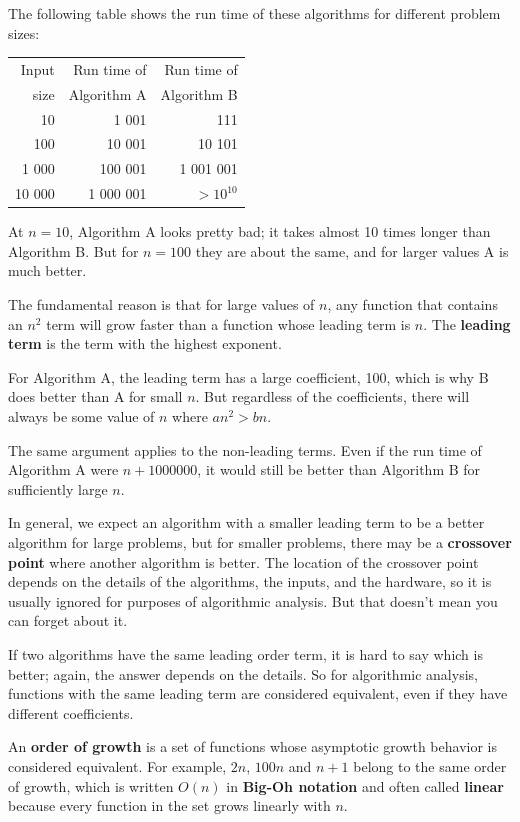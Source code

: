 \documentclass[10pt]{book}
\begin{document}
The following table shows the run time of these algorithms
for different problem sizes:

\begin{tabular}{|r|r|r|}
\hline
Input     &   Run time of     & Run time of \\
size      &   Algorithm A     & Algorithm B \\
\hline
10        &   1 001           & 111         \\
100       &   10 001          & 10 101         \\
1 000     &   100 001         & 1 001 001         \\
10 000    &   1 000 001       & $> 10^{10}$         \\
\hline
\end{tabular}

At $n=10$, Algorithm A looks pretty bad; it takes almost 10 times
longer than Algorithm B.  But for $n=100$ they are about the same, and
for larger values A is much better.

The fundamental reason is that for large values of $n$, any function
that contains an $n^2$ term will grow faster than a function whose
leading term is $n$.  The {\bf leading term} is the term with the
highest exponent.

For Algorithm A, the leading term has a large coefficient, 100, which
is why B does better than A for small $n$.  But regardless of the
coefficients, there will always be some value of $n$ where $a n^2 > b
n$.

The same argument applies to the non-leading terms.  Even if the run
time of Algorithm A were $n + 1000000$, it would still be better than
Algorithm B for sufficiently large $n$.

In general, we expect an algorithm with a smaller leading term to be a
better algorithm for large problems, but for smaller problems, there
may be a {\bf crossover point} where another algorithm is better.  The
location of the crossover point depends on the details of the
algorithms, the inputs, and the hardware, so it is usually ignored for
purposes of algorithmic analysis.  But that doesn't mean you can forget
about it.

If two algorithms have the same leading order term, it is hard to say
which is better; again, the answer depends on the details.  So for
algorithmic analysis, functions with the same leading term
are considered equivalent, even if they have different coefficients.

An {\bf order of growth} is a set of functions whose asymptotic growth
behavior is considered equivalent.  For example, $2n$, $100n$ and $n +
1$ belong to the same order of growth, which is written $O(n)$ in
{\bf Big-Oh notation} and often called {\bf linear} because every function
in the set grows linearly with $n$.
\end{document}
